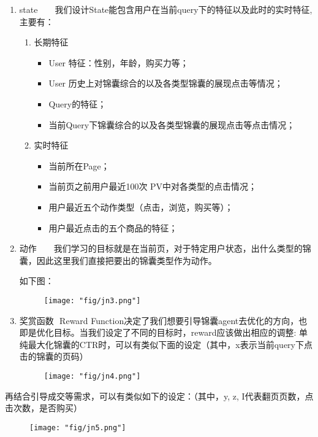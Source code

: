 \begin{enumerate}
\item state     
我们设计State能包含用户在当前query下的特征以及此时的实时特征,主要有：
\begin{enumerate}
\item 长期特征 
\begin{itemize}
\item User 特征：性别，年龄，购买力等；     
\item User 历史上对锦囊综合的以及各类型锦囊的展现点击等情况；     
\item Query的特征；     
\item 当前Query下锦囊综合的以及各类型锦囊的展现点击等点击情况； 
\end{itemize}

\item 实时特征 
\begin{itemize}
\item 当前所在Page；     
\item 当前页之前用户最近100次 PV中对各类型的点击情况；     
\item 用户最近五个动作类型（点击，浏览，购买等）；     
\item 用户最近点击的五个商品的特征；
\end{itemize}

\end{enumerate}
\item 动作     我们学习的目标就是在当前页，对于特定用户状态，出什么类型的锦囊，因此这里我们直接把要出的锦囊类型作为动作。

如下图：
\begin{figure}[!h]
	\centering
	\texttt{[image: "fig/jn3.png"]}
	\caption{}
	\label{fig:jn3}
\end{figure}

\item 奖赏函数 
Reward Function决定了我们想要引导锦囊agent去优化的方向，也即是优化目标。当我们设定了不同的目标时，reward应该做出相应的调整: 单纯最大化锦囊的CTR时，可以有类似下面的设定（其中，x表示当前query下点击的锦囊的页码）
\begin{figure}[!h]
	\centering
	\texttt{[image: "fig/jn4.png"]}
	\caption{}
	\label{fig:jn4}
\end{figure}

\end{enumerate}

再结合引导成交等需求，可以有类似如下的设定：（其中，y, z, I代表翻页页数，点击次数，是否购买）
\begin{figure}[!h]
	\centering
	\texttt{[image: "fig/jn5.png"]}
	\caption{}
	\label{fig:jn5}
\end{figure}

